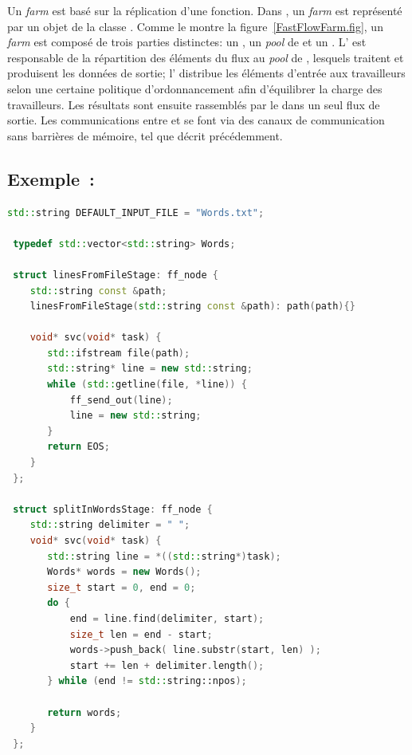 Un \emph{farm} est bas\'e sur la r\'eplication d'une fonction. Dans , un \emph{farm} est repr\'esent\'e par un objet de la classe . Comme le montre la figure~\ref{FastFlowFarm.fig}, un \emph{farm} est compos\'e de trois parties distinctes: un , un  \emph{pool} de  et un . L' est responsable de la r\'epartition des \'el\'ements du flux au \emph{pool} de , lesquels traitent et produisent les donn\'ees de sortie; l' distribue les \'el\'ements d'entr\'ee aux travailleurs selon une certaine politique d'ordonnancement afin d'\'equilibrer la charge des travailleurs. Les r\'esultats sont ensuite rassembl\'es par le  dans un seul flux de sortie. Les communications entre  et  se font via des canaux de communication sans barri\`eres de m\'emoire, tel que d\'ecrit pr\'ec\'edemment.


\subsection{Exemple~: }


\begin{lstlisting}[language=c++, 
caption={Le code source \TT{FastFlow} d'une application pour compter le nombre d'occurrences de mots.},
label={wordcountFastFlow},
frame=single,
float
]
 std::string DEFAULT_INPUT_FILE = "Words.txt";
 
 typedef std::vector<std::string> Words;
 
 struct linesFromFileStage: ff_node {
    std::string const &path;
    linesFromFileStage(std::string const &path): path(path){}
 
    void* svc(void* task) {
       std::ifstream file(path);
       std::string* line = new std::string;
       while (std::getline(file, *line)) {
           ff_send_out(line);
           line = new std::string;
       }
       return EOS;
    }
 };
 
 struct splitInWordsStage: ff_node {
    std::string delimiter = " ";
    void* svc(void* task) {
       std::string line = *((std::string*)task);
       Words* words = new Words();
       size_t start = 0, end = 0;
       do {
           end = line.find(delimiter, start);
           size_t len = end - start;
           words->push_back( line.substr(start, len) );
           start += len + delimiter.length();
       } while (end != std::string::npos);

       return words;
    }
 };
\end{lstlisting}
 
